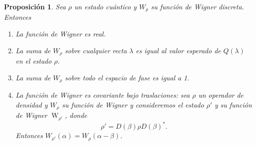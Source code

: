 \documentclass[a4paper,11pt]{report}
\DeclareMathOperator{\W}{W}
\newtheorem{proposition}{Proposición}
\begin{document}
  \begin{proposition}
    Sea $\rho$ un estado cuántico y $W_\rho$ su función de
    Wigner discreta. Entonces
    \begin{enumerate}
      \item La función de Wigner es real.
      \item La suma de $W_\rho$ sobre cualquier recta
        $\lambda$ es igual al valor esperado de $Q(\lambda)$ 
        en el estado $\rho$.
      \item La suma de $W_\rho$ sobre todo el espacio de fase
        es igual a 1.
      \item La función de Wigner es covariante bajo
        traslaciones: sea $\rho$ un operador de densidad y
        $W_\rho$ su función de Wigner y consideremos el
        estado $\rho'$ y su función de Wigner $\W_{\rho'}$,
        donde
        \[
          \rho '
          = D(\beta) \rho D(\beta)^{*}.
        \] 
        Entonces $W_{\rho'}(\alpha) =
        W_{\rho}(\alpha-\beta)$.
    \end{enumerate}
  \end{proposition}
\end{document}
